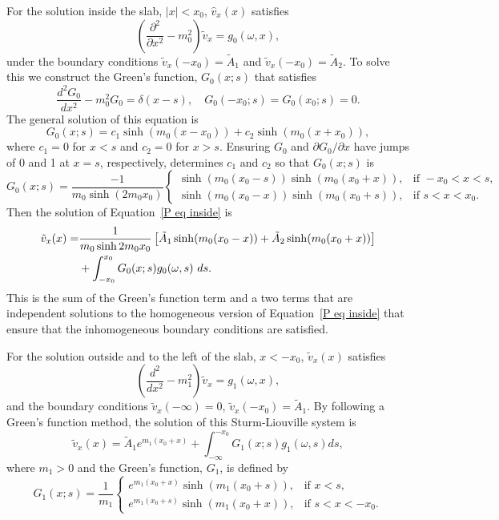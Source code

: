 \documentclass[12pt]{../style-files/ociamthesis}
\begin{document}
For the solution inside the slab, $|x| < x_0$, $\hat{v}_x(x)$ satisfies
\begin{equation}
\left( \frac{\partial^2}{\partial x^2} - m_0^2 \right) \tilde{v}_x = g_0(\omega, x),
\end{equation}
under the boundary conditions $\tilde{v}_x(-x_0) = \tilde{A}_1$ and $\tilde{v}_x(-x_0) = \tilde{A}_2$. To solve this we construct the Green's function, $G_0(x;s)$ that satisfies
\begin{equation}
\frac{d^2G_0}{dx^2} - m_0^2 G_0 = \delta(x-s), \quad G_0(-x_0;s) = G_0(x_0;s) = 0.
\end{equation}
The general solution of this equation is
\begin{equation}
G_0(x;s) = c_1\sinh(m_0(x - x_0)) + c_2\sinh(m_0(x + x_0)),
\end{equation}
where $c_1 = 0$ for $x < s$ and $c_2 = 0$ for $x > s$. Ensuring $G_0$ and $\partial G_0 / \partial x$ have jumps of 0 and 1 at $x = s$, respectively, determines $c_1$ and $c_2$ so that $G_0(x;s)$ is
\begin{equation}
G_0(x;s) = \frac{-1}{m_0\sinh(2m_0 x_0)}
\begin{cases}
\sinh(m_0(x_0 - s))\sinh(m_0(x_0 + x)), & \text{if } -x_0<x<s, \\
\sinh(m_0(x_0 - x))\sinh(m_0(x_0 + s)), & \text{if } s<x<x_0.
\end{cases}
\end{equation}
Then the solution of Equation~\eqref{P eq inside} is
\begin{align}
\tilde{v}_x(x) = &\frac{1}{m_0\sinh{2m_0 x_0}} \left[ \tilde{A}_1\sinh(m_0(x_0 - x)) + \tilde{A}_2\sinh(m_0(x_0 + x)) \right] \notag \\
&+ \int_{-x_0}^{x_0} G_0(x;s) g_0(\omega, s) ~ds.
\label{V sol 0}
\end{align}
This is the sum of the Green's function term and a two terms that are independent solutions to the homogeneous version of Equation~\eqref{P eq inside} that ensure that the inhomogeneous boundary conditions are satisfied.

For the solution outside and to the left of the slab, $x < -x_0$, $\tilde{v}_x(x)$ satisfies
\begin{equation}
\left(\frac{d^2}{dx^2} - m_1^2 \right) \tilde{v}_x = g_1(\omega, x),
\end{equation}
and the boundary conditions $\tilde{v}_x(-\infty) = 0$, $\tilde{v}_x(-x_0) = \tilde{A}_1$. By following a Green's function method, the solution of this Sturm-Liouville system is
\begin{equation}
\tilde{v}_x(x) = \tilde{A}_1e^{m_1(x_0+x)} + \int_{-\infty}^{-x_0} G_1(x; s) g_1(\omega, s) ds,
\label{V sol 1}
\end{equation}
where $m_1 > 0$ and the Green's function, $G_1$, is defined by
\begin{equation}
G_1(x; s) = \frac{1}{m_1}
\begin{cases}
e^{m_1(x_0 + x)}\sinh(m_1(x_0 + s)), & \text{if } x < s, \\
e^{m_1(x_0 + s)}\sinh(m_1(x_0 + x)), & \text{if } s < x < -x_0.
\end{cases}
\end{equation}
\end{document}
